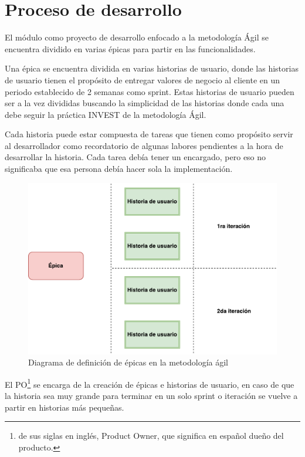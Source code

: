 \section{Proceso de desarrollo}
El módulo como proyecto de desarrollo enfocado a la metodología Ágil se encuentra dividido en varias épicas para partir en las funcionalidades.

Una épica se encuentra dividida en varias historias de usuario, donde las historias de usuario tienen el propósito de entregar valores de negocio al cliente en un periodo establecido de 2 semanas como sprint. Estas historias de usuario pueden ser a la vez divididas buscando la simplicidad de las historias donde cada una debe seguir la práctica INVEST de la metodología Ágil.

Cada historia puede estar compuesta de tareas que tienen como propósito servir al desarrollador como recordatorio de algunas labores pendientes a la hora de desarrollar la historia. Cada tarea debía tener un encargado, pero eso no significaba que esa persona debía hacer sola la implementación.

\begin{figure}[H]
\centering
\includegraphics[width=125mm,scale=1]{Capitulos/PropuestadeSolucion/Imagenes/epic_diagram}
\caption{Diagrama de definición de épicas en la metodología ágil}
  \label{epic}
\end{figure}

El PO\footnote{de sus siglas en inglés, Product Owner, que significa en español dueño del producto.} se encarga de la creación de épicas e historias de usuario, en caso de que la historia sea muy grande para terminar en un solo sprint o iteración se vuelve a partir en historias más pequeñas. 

